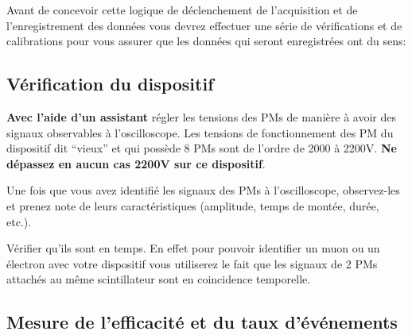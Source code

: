 Avant de concevoir cette logique de déclenchement de l'acquisition et de l'enregistrement des donn\'ees vous devrez effectuer une s\'erie de v\'erifications
et de calibrations pour vous assurer que les donn\'ees qui seront enregistrées
ont du sens:

\begin{center}
\end{center}

\subsection{Vérification du dispositif}
\textbf{Avec l'aide d'un assistant} régler les tensions des PMs de manière à 
avoir des signaux observables \`a l'oscilloscope. Les tensions de fonctionnement des PM du dispositif dit ``vieux'' et qui possède 8 PMs sont de l'ordre de 2000 à 2200V. \textbf{Ne dépassez en aucun cas 2200V sur ce dispositif}.

Une fois que vous avez identifi\'e les signaux des PMs à l'oscilloscope, observez-les et prenez note de leurs caract\'eristiques (amplitude, temps de 
mont\'ee, dur\'ee, etc.).

Vérifier qu'ils sont en temps. En effet pour pouvoir identifier un muon ou un \'electron
avec votre dispositif vous utiliserez le fait que les signaux de
2 PMs attach\'es au m\^eme scintillateur sont en coincidence temporelle.

\subsection{Mesure de l'efficacité et du taux d'événements}

